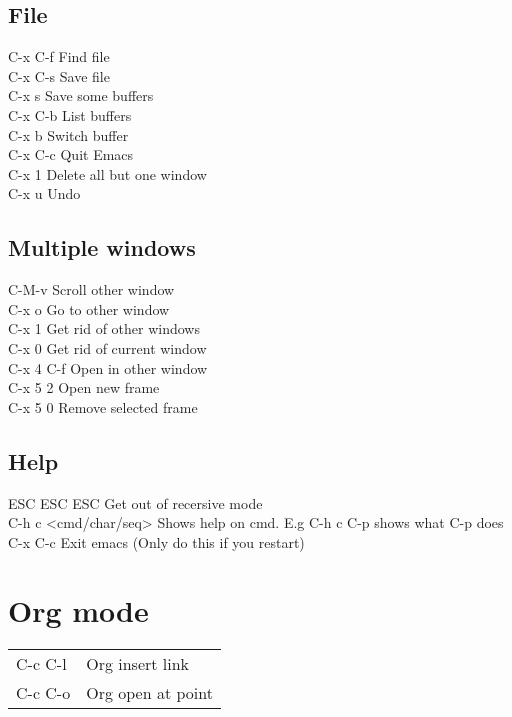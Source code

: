 \documentclass[11pt]{article}
\begin{document}
\subsection{File}
\label{sec:org72f4113}
C-x C-f		Find file\\
C-x C-s		Save file\\
C-x s		Save some buffers\\
C-x C-b		List buffers\\
C-x b		Switch buffer\\
C-x C-c		Quit Emacs\\
C-x 1		Delete all but one window\\
C-x u		Undo\\


\subsection{Multiple windows}
\label{sec:org5480cee}
C-M-v             Scroll other window\\
C-x o             Go to other window\\
C-x 1             Get rid of other windows\\
C-x 0             Get rid of current window\\
C-x 4 C-f         Open in other window\\
C-x 5 2           Open new frame\\
C-x 5 0           Remove selected frame\\

\subsection{Help}
\label{sec:org506869d}
ESC ESC ESC       Get out of recersive mode\\
C-h c <cmd/char/seq>   Shows help on cmd. E.g C-h c C-p shows what C-p does\\
C-x C-c           Exit emacs (Only do this if you restart)\\

\section{Org mode}
\label{sec:org4b0d139}
\begin{center}
\begin{tabular}{ll}
\hline
C-c C-l & Org insert link\\
C-c C-o & Org open at point\\
\hline
\end{tabular}
\end{center}
\end{document}
